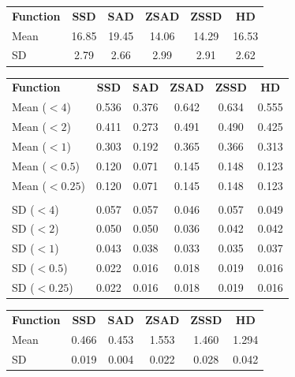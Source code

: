 \documentclass[conference]{IEEEtran}
\begin{document}
\begin{center}
    \begin{tabular}{l c c c c c}
        \textbf{Function} & \textbf{SSD} & \textbf{SAD} & \textbf{ZSAD} & \textbf{ZSSD} & \textbf{HD} \\ [0.5ex] 
        Mean & 16.85 & 19.45 & 14.06 & 14.29 & 16.53 \\
        SD & 2.79 & 2.66 & 2.99 & 2.91 & 2.62
    \end{tabular}
\end{center}
\begin{center}
    \begin{tabular}{l c c c c c}
        \textbf{Function} & \textbf{SSD} & \textbf{SAD} & \textbf{ZSAD} & \textbf{ZSSD} & \textbf{HD} \\ [0.5ex] 
        Mean ($<4$) & 0.536 & 0.376 & 0.642 & 0.634 & 0.555 \\
        Mean ($<2$) & 0.411 & 0.273 & 0.491 & 0.490 & 0.425 \\
        Mean ($<1$) & 0.303 & 0.192 & 0.365 & 0.366 & 0.313 \\
        Mean ($<0.5$) & 0.120 & 0.071 & 0.145 & 0.148 & 0.123 \\
        Mean ($<0.25$) & 0.120 & 0.071 & 0.145 & 0.148 & 0.123 \\
        & & & & & \\
        SD ($<4$) & 0.057 & 0.057 & 0.046 & 0.057 & 0.049 \\
        SD ($<2$) & 0.050 & 0.050 & 0.036 & 0.042 & 0.042 \\
        SD ($<1$) & 0.043 & 0.038 & 0.033 &  0.035 & 0.037 \\
        SD ($<0.5$) & 0.022 & 0.016 & 0.018 & 0.019 & 0.016 \\
        SD ($<0.25$) & 0.022 & 0.016 & 0.018 & 0.019 & 0.016 \\
    \end{tabular}
\end{center}
\begin{center}
    \begin{tabular}{l c c c c c}
        \textbf{Function} & \textbf{SSD} & \textbf{SAD} & \textbf{ZSAD} & \textbf{ZSSD} & \textbf{HD} \\ [0.5ex] 
        Mean & 0.466 & 0.453 & 1.553 & 1.460 & 1.294 \\
        SD & 0.019 & 0.004 & 0.022 & 0.028 & 0.042
    \end{tabular}
\end{center}
\end{document}
